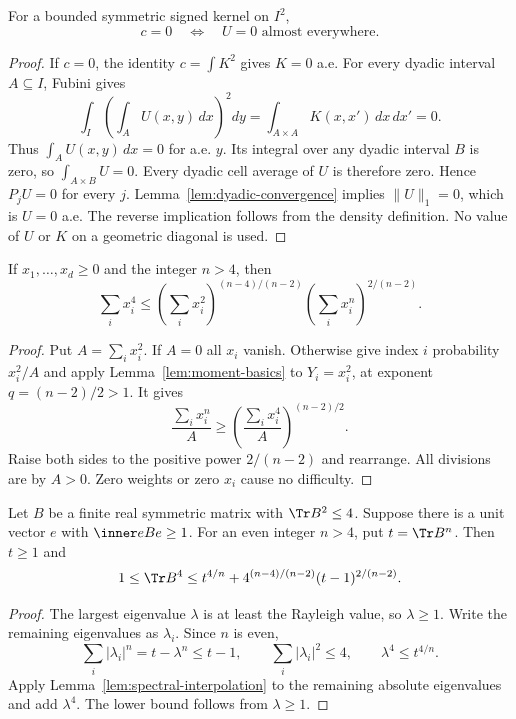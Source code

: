 \begin{lemma}
\label{lem:c-zero}
\proved For a bounded symmetric signed kernel on $I^2$,
\[
 c=0\quad\Longleftrightarrow\quad U=0\text{ almost everywhere}.
\]
\end{lemma}
\begin{proof}
If $c=0$, the identity $c=\int K^2$ gives $K=0$ a.e.  For every dyadic interval $A\subseteq I$,
Fubini gives
\[
 \int_I\left(\int_A U(x,y)\,dx\right)^2dy
 =\int_{A\times A}K(x,x')\,dx\,dx'=0.
\]
Thus $\int_AU(x,y)\,dx=0$ for a.e. $y$.  Its integral over any dyadic interval $B$ is zero,
so $\int_{A\times B}U=0$.  Every dyadic cell average of $U$ is therefore zero.  Hence
$P_jU=0$ for every $j$.  Lemma~\ref{lem:dyadic-convergence} implies $\|U\|_1=0$, which is
$U=0$ a.e.  The reverse implication follows from the density definition.
No value of $U$ or $K$ on a geometric diagonal is used.
\end{proof}

\begin{lemma}
\label{lem:spectral-interpolation}
\proved If $x_1,\ldots,x_d\ge0$ and the integer $n>4$, then
\[
 \sum_i x_i^4
 \le\left(\sum_i x_i^2\right)^{(n-4)/(n-2)}
     \left(\sum_i x_i^n\right)^{2/(n-2)}.
\]
\end{lemma}
\begin{proof}
Put $A=\sum_i x_i^2$.  If $A=0$ all $x_i$ vanish.  Otherwise give index $i$ probability
$x_i^2/A$ and apply Lemma~\ref{lem:moment-basics} to $Y_i=x_i^2$, at exponent
$q=(n-2)/2>1$.  It gives
\[
 \frac{\sum_i x_i^n}{A}
 \ge\left(\frac{\sum_i x_i^4}{A}\right)^{(n-2)/2}.
\]
Raise both sides to the positive power $2/(n-2)$ and rearrange.  All divisions are by $A>0$.
Zero weights or zero $x_i$ cause no difficulty.
\end{proof}

\begin{lemma}
\label{lem:spectral-concentration}
\proved Let $B$ be a finite real symmetric matrix with $\Tr B^2\le4$.  Suppose there is a
unit vector $e$ with $\inner e{Be}\ge1$.  For an even integer $n>4$, put $t=\Tr B^n$.
Then $t\ge1$ and
\[
 1\le\Tr B^4
 \le t^{4/n}+4^{(n-4)/(n-2)}(t-1)^{2/(n-2)}.
\]
\end{lemma}
\begin{proof}
The largest eigenvalue $\lambda$ is at least the Rayleigh value, so $\lambda\ge1$.
Write the remaining eigenvalues as $\lambda_i$.  Since $n$ is even,
\[
 \sum_i|\lambda_i|^n=t-\lambda^n\le t-1,
 \qquad\sum_i|\lambda_i|^2\le4,
 \qquad\lambda^4\le t^{4/n}.
\]
Apply Lemma~\ref{lem:spectral-interpolation} to the remaining absolute eigenvalues and add
$\lambda^4$.  The lower bound follows from $\lambda\ge1$.
\end{proof}

